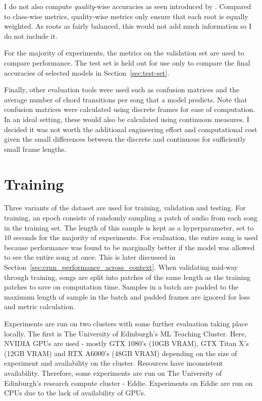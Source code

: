 I do not also compute \emph{quality}-wise accuracies as seen introduced by \citet{CurriculumLearning}. Compared to class-wise metrics, quality-wise metrics only ensure that each root is equally weighted. As roots as fairly balanced, this would not add much information so I do not include it.

For the majority of experiments, the metrics on the validation set are used to compare performance. The test set is held out for use only to compare the final accuracies of selected models in Section~\ref{sec:test-set}.

Finally, other evaluation tools were used such as confusion matrices and the average number of chord transitions per song that a model predicts. Note that confusion matrices were calculated using discrete frames for ease of computation. In an ideal setting, these would also be calculated using continuous measures. I decided it was not worth the additional engineering effort and computational cost given the small differences between the discrete and continuous for sufficiently small frame lengths.

\section{Training}\label{sec:training}

Three variants of the dataset are used for training, validation and testing. For training, an epoch consists of randomly sampling a patch of audio from each song in the training set. The length of this sample is kept as a hyperparameter, set to $10$ seconds for the majority of experiments. For evaluation, the entire song is used because performance was found to be marginally better if the model was allowed to see the entire song at once. This is later discussed in Section~\ref{sec:crnn_performance_across_context}. When validating mid-way through training, songs are split into patches of the same length as the training patches to save on computation time. Samples in a batch are padded to the maximum length of sample in the batch and padded frames are ignored for loss and metric calculation.

Experiments are run on two clusters with some further evaluation taking place locally. The first is The University of Edinburgh's ML Teaching Cluster. Here, NVIDIA GPUs are used - mostly GTX 1080's (10GB VRAM), GTX Titan X's (12GB VRAM) and RTX A6000's (48GB VRAM) depending on the size of experiment and availability on the cluster. Resources have inconsistent availability. Therefore, some experiments are run on The University of Edinburgh's research compute cluster - Eddie. Experiments on Eddie are run on CPUs due to the lack of availability of GPUs. 

